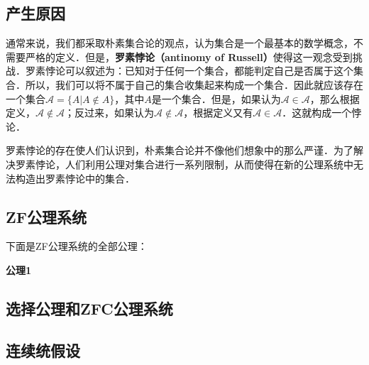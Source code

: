\begin{issues}
\issueTODO
\end{issues}

\subsection{产生原因}
通常来说，我们都采取朴素集合论的观点，认为集合是一个最基本的数学概念，不需要严格的定义．但是，\textbf{罗素悖论（antinomy of Russell）}使得这一观念受到挑战．罗素悖论可以叙述为：已知对于任何一个集合，都能判定自己是否属于这个集合．所以，我们可以将不属于自己的集合收集起来构成一个集合．因此就应该存在一个集合$\mathcal{A}=\{A|A\notin A\}$，其中$A$是一个集合．但是，如果认为$\mathcal{A}\in\mathcal{A}$，那么根据定义，$\mathcal{A}\notin\mathcal{A}$；反过来，如果认为$\mathcal{A}\notin\mathcal{A}$，根据定义又有$\mathcal{A}\in\mathcal{A}$．这就构成一个悖论．

罗素悖论的存在使人们认识到，朴素集合论并不像他们想象中的那么严谨．为了解决罗素悖论，人们利用公理对集合进行一系列限制，从而使得在新的公理系统中无法构造出罗素悖论中的集合．

\subsection{ZF公理系统}
下面是ZF公理系统的全部公理：

\textbf{公理1} 

\subsection{选择公理和ZFC公理系统}

\subsection{连续统假设}



